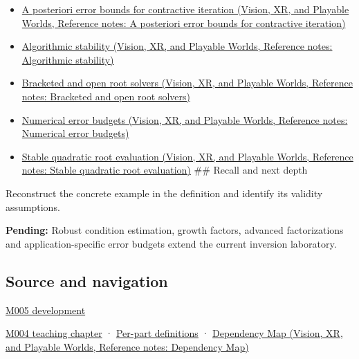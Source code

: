 \begin{itemize}
\tightlist
\item
  \href{../07-Vision-XR-and-Playable-Worlds/main.pdf\#nameddest=appendix-d83b0ad1be7f}{A posteriori error bounds for contractive iteration (Vision, XR, and Playable Worlds, Reference notes: A posteriori error bounds for contractive iteration)}
\item
  \href{../07-Vision-XR-and-Playable-Worlds/main.pdf\#nameddest=appendix-aa2bf0d79639}{Algorithmic stability (Vision, XR, and Playable Worlds, Reference notes: Algorithmic stability)}
\item
  \href{../07-Vision-XR-and-Playable-Worlds/main.pdf\#nameddest=appendix-f63eb850796d}{Bracketed and open root solvers (Vision, XR, and Playable Worlds, Reference notes: Bracketed and open root solvers)}
\item
  \href{../07-Vision-XR-and-Playable-Worlds/main.pdf\#nameddest=appendix-31b8c295e05f}{Numerical error budgets (Vision, XR, and Playable Worlds, Reference notes: Numerical error budgets)}
\item
  \href{../07-Vision-XR-and-Playable-Worlds/main.pdf\#nameddest=appendix-b9afba7f63e5}{Stable quadratic root evaluation (Vision, XR, and Playable Worlds, Reference notes: Stable quadratic root evaluation)} \#\# Recall and next depth
\end{itemize}

Reconstruct the concrete example in the definition and identify its validity assumptions.

\textbf{Pending:} Robust condition estimation, growth factors, advanced factorizations and application-specific error budgets extend the current inversion laboratory.

\subsection{Source and navigation}\label{appendix-8f6a01f284a7-source-and-navigation}

\hypertarget{appendix-8f6a01f284a7-source-and-navigation}{}

\hyperref[01-foundations-i-ch001-when-arithmetic-meets-uncertainty]{M005 development}

\hyperref[01-foundations-i-ch001-a-stretching-ruler-for-real-valued-quantities]{M004 teaching chapter} · \hyperref[appendix-fd090d982a15-m004---parts-61-76]{Per-part definitions} · \href{../07-Vision-XR-and-Playable-Worlds/main.pdf\#nameddest=appendix-4ad47bdd269a}{Dependency Map (Vision, XR, and Playable Worlds, Reference notes: Dependency Map)}
